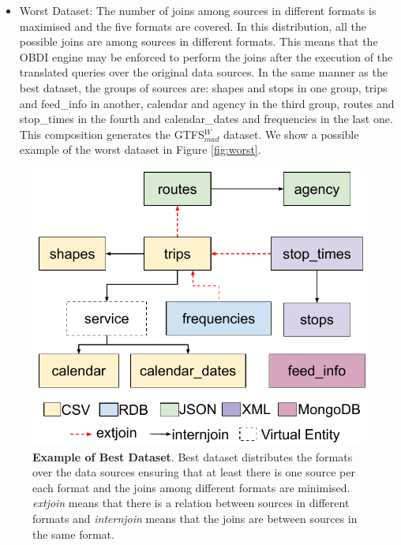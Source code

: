 \begin{enumerate}[label=\textbf{\arabic*})]
\begin{itemize}
        \item Worst Dataset: The number of joins among sour\-ces in different formats is maximised and the five formats are covered. In this distribution, all the possible joins are among
        sources in different formats. This means that the OBDI engine may be enforced to perform the joins after the execution of the translated queries over the original data sources. In the same manner as the best dataset, the groups of sources are: shapes and stops in one group, trips and feed\_info in another, calendar and agency in the third group, routes and stop\_times in the fourth and calendar\_dates and frequencies in the last one. This composition generates the GTFS$_{mad}^{W}$ dataset. We show a possible example of the worst dataset in Figure \ref{fig:worst}. 
    \end{itemize}
   
\end{enumerate}
 

\begin{figure}[h]
    \centering
    \includegraphics[width=0.85\linewidth]{figures/best-dist.pdf}
    \caption{\textbf{Example of Best Dataset}. Best dataset distributes the formats over the data sources ensuring that at least there is one source per each format and the joins among different formats are minimised. \textit{extjoin} means that there is a relation between sources in different formats and \textit{internjoin} means that the joins are between sources in the same format.}
    \label{fig:best}
\end{figure}


